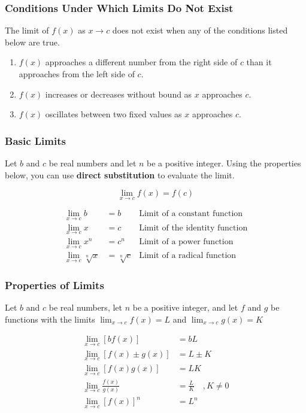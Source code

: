 \subsubsection{Conditions Under Which Limits Do Not Exist}
The limit of \(f(x)\) as \(x \rightarrow c\) does not exist when any of the
conditions listed below are true.
\begin{enumerate}
	\item \(f(x)\) approaches a different number from the right side of \(c\)
	      than it approaches from the left side of \(c\).
	\item \(f(x)\) increases or decreases without bound as \(x\) approaches \(c\).
	\item \(f(x)\) oscillates between two fixed values as \(x\) approaches \(c\).
\end{enumerate}

\subsubsection{Basic Limits}

Let \(b\) and \(c\) be real numbers and let \(n\) be a positive integer. Using the properties below, you can use \textbf{direct substitution} to evaluate the limit.

\[
	\lim_{x \to c} f(x) = f(c)
\]

\begin{align}
	\lim_{x \to c}b           & = b           & \text{Limit of a constant function}   \\
	\lim_{x \to c}x           & = c           & \text{Limit of the identity function} \\
	\lim_{x \to c}x^n         & = c^n         & \text{Limit of a power function}      \\
	\lim_{x \to c}\sqrt[n]{x} & = \sqrt[n]{c} & \text{Limit of a radical function}
\end{align}

\subsubsection{Properties of Limits}
Let \(b\) and \(c\) be real numbers, let \(n\) be a positive integer, and let \(f\) and \(g\) be functions with the limits \(\lim _{x \rightarrow c} f(x)=L\) and \(\lim _{x \rightarrow c} g(x)=K\)

\begin{align}
	\lim_{x \to c} [b f(x)]          & =b L \quad                   \\
	\lim_{x \to c}[f(x) \pm g(x)]    & =L \pm K                     \\
	\lim_{x \to c}[f(x) g(x)]        & =L K \quad                   \\
	\lim_{x \to c} \frac{f(x)}{g(x)} & =\frac{L}{K} \quad, K \neq 0 \\
	\lim_{x \to c}{[f(x)]}^{n}       & =L^{n}
\end{align}

